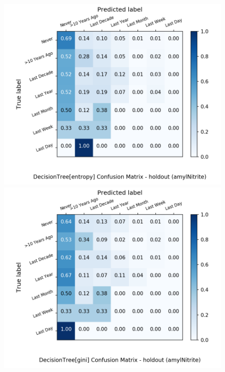 \begin{figure}[H]
	\centering
	\begin{minipage}[b]{0.32\textwidth}
		\includegraphics[width=1.1\textwidth]{Plots/drugs/amylNitrite_DecisionTree_entropy_balance_False_holdout.png}
	\end{minipage}
	\begin{minipage}[b]{0.32\textwidth}
		\includegraphics[width=1.1\textwidth]{Plots/drugs/amylNitrite_DecisionTree_gini_balance_False_holdout.png}
	\end{minipage}

\end{figure}
